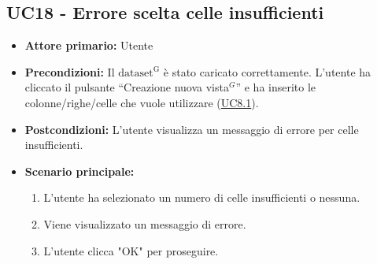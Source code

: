 \subsection{UC18 - Errore scelta celle insufficienti}
\label{sec:UC18 - Errore-celle-insufficienti}
\begin{itemize}
    \item \textbf{Attore primario:} Utente
    \item \textbf{Precondizioni:} Il ${\mathrm{dataset^{G}}}$ è stato caricato correttamente. L'utente ha cliccato il pulsante ``Creazione nuova vista$^{G}$'' e ha inserito le colonne/righe/celle che vuole utilizzare (\hyperref[sec:UC8.1]{UC8.1}).
    \item \textbf{Postcondizioni:} L'utente visualizza un messaggio di errore per celle insufficienti. 
    \item \textbf{Scenario principale:}
          \begin{enumerate}
              \item L'utente ha selezionato un numero di celle insufficienti o nessuna.
              \item Viene visualizzato un messaggio di errore.
              \item L'utente clicca "OK" per proseguire.
          \end{enumerate} 
\end{itemize}

